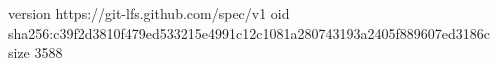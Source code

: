 version https://git-lfs.github.com/spec/v1
oid sha256:c39f2d3810f479ed533215e4991c12c1081a280743193a2405f889607ed3186c
size 3588
